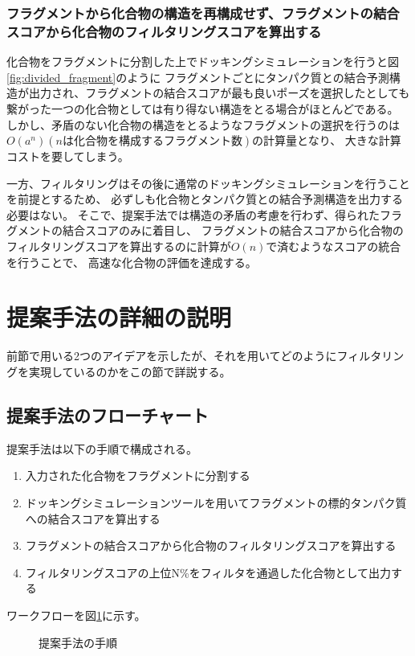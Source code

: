 \subsubsection{フラグメントから化合物の構造を再構成せず、フラグメントの結合スコアから化合物のフィルタリングスコアを算出する}
化合物をフラグメントに分割した上でドッキングシミュレーションを行うと図\ref{fig:divided_fragment}のように
フラグメントごとにタンパク質との結合予測構造が出力され、フラグメントの結合スコアが最も良いポーズを選択したとしても
繋がった一つの化合物としては有り得ない構造をとる場合がほとんどである。
しかし、矛盾のない化合物の構造をとるようなフラグメントの選択を行うのは$O(a^n) (nは化合物を構成するフラグメント数)$の計算量となり、
大きな計算コストを要してしまう。

一方、フィルタリングはその後に通常のドッキングシミュレーションを行うことを前提とするため、
必ずしも化合物とタンパク質との結合予測構造を出力する必要はない。
そこで、提案手法では構造の矛盾の考慮を行わず、得られたフラグメントの結合スコアのみに着目し、
フラグメントの結合スコアから化合物のフィルタリングスコアを算出するのに計算が$O(n)$で済むようなスコアの統合を行うことで、
高速な化合物の評価を達成する。

\section{提案手法の詳細の説明}
前節で用いる2つのアイデアを示したが、それを用いてどのようにフィルタリングを実現しているのかをこの節で詳説する。

\subsection{提案手法のフローチャート}\label{subsec:flowchart}
提案手法は以下の手順で構成される。
\begin{enumerate}
\item 入力された化合物をフラグメントに分割する
\item ドッキングシミュレーションツールを用いてフラグメントの標的タンパク質への結合スコアを算出する
\item フラグメントの結合スコアから化合物のフィルタリングスコアを算出する
\item フィルタリングスコアの上位N\%をフィルタを通過した化合物として出力する
\end{enumerate}
ワークフローを図\ref{fig:workflow}に示す。

\begin{figure}[p]
 \begin{center}
  \caption{提案手法の手順}
  \label{fig:workflow}
 \end{center}
\end{figure}

